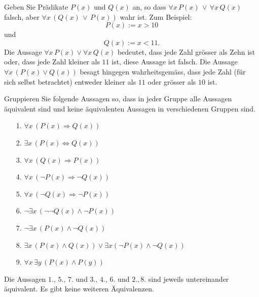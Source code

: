 \begin{example}
Geben Sie Prädikate $P(x)$ und $Q(x)$ an, so dass $\forall x\,P(x)\,\lor\,\forall x\,Q(x)$ falsch, aber $\forall x\,(Q(x)\,\lor\, P(x))$ wahr ist.
\tcblower
Zum Beispiel:
\[
P(x):= x>10
\]
und
\[
Q(x):= x<11.
\]
Die Aussage $\forall x\, P(x)\lor \forall x\,Q(x)$ bedeutet, dass jede Zahl grösser als Zehn ist oder, dass jede Zahl kleiner als $11$ ist, diese Aussage ist falsch. Die Aussage $\forall x\,(P(x)\lor Q(x))$ besagt hingegen wahrheitsgemäss, dass jede Zahl (für sich selbst betrachtet) entweder kleiner als $11$ oder grösser als $10$ ist.
\end{example}

\begin{example}
Gruppieren Sie folgende Aussagen so, dass in jeder Gruppe alle Aussagen äquivalent sind und keine äquivalenten Aussagen in verschiedenen Gruppen sind.
\begin{itemize}
\item[1.] $\forall x\,(P(x)\Rightarrow Q(x))$
\item[2.] $\exists x\,(P(x)\Leftrightarrow Q(x))$
\item[3.] $\forall x\,(Q(x)\Rightarrow P(x))$
\item[4.] $\forall x\,(\neg P(x)\Rightarrow \neg Q(x))$
\item[5.] $\forall x\,(\neg Q(x)\Rightarrow \neg P(x))$
\item[6.] $\neg\exists x\,(\neg \neg Q(x)\land\neg P(x) )$
\item[7.] $\neg\exists x\,(P(x)\land\neg Q(x))$
\item[8.] $\exists x\, (P(x)\land Q(x))\lor \exists x (\neg P(x)\land\neg Q(x))$
\item[9.] $\forall x\,\exists y\,(P(x)\land P(y))$
\end{itemize}
\tcblower
Die Aussagen $1.,\,5.,\,7.$ und $3.,\,4.,\,6.$ und $2.,8.$ sind jeweils untereinander äquivalent. Es gibt keine weiteren Äquivalenzen.
\end{example}